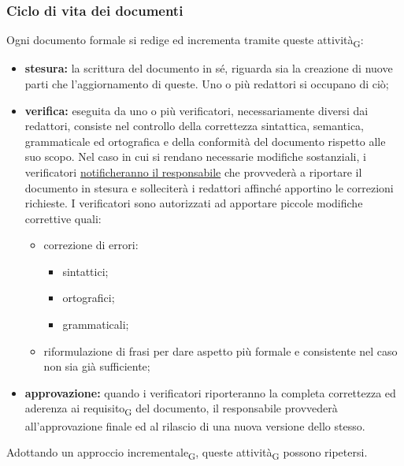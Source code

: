     \subsubsection{Ciclo di vita dei documenti}
    \label{ciclovitadoc}
    Ogni documento formale si redige ed incrementa tramite queste attività\textsubscript{G}:
    \begin{itemize}
        \item \textbf{stesura: }la scrittura del documento in sé, riguarda sia la creazione di nuove parti che l'aggiornamento di queste. Uno o più redattori si occupano di ciò;
        \item \textbf{verifica: }eseguita da uno o più verificatori, necessariamente diversi dai redattori, consiste nel controllo della correttezza sintattica, semantica, grammaticale ed ortografica e della conformità del documento rispetto alle suo scopo. Nel caso in cui si rendano necessarie modifiche sostanziali, i verificatori \hyperref[risoluzioneproblemi]{notificheranno il responsabile} che provvederà a riportare il documento in stesura e solleciterà i redattori affinché apportino le correzioni richieste. I verificatori sono autorizzati ad apportare piccole modifiche correttive quali:
        \begin{itemize}
            \item correzione di errori:
                \begin{itemize}
                    \item sintattici;
                    \item ortografici;
                    \item grammaticali;
                \end{itemize}

            \item riformulazione di frasi per dare aspetto più formale e consistente nel caso non sia già sufficiente;
        \end{itemize}
        \item \textbf{approvazione: }quando i verificatori riporteranno la completa correttezza ed aderenza ai requisito\textsubscript{G} del documento, il responsabile provvederà all'approvazione finale ed al rilascio di una nuova versione dello stesso.
    \end{itemize}
    Adottando un approccio incrementale\textsubscript{G}, queste attività\textsubscript{G} possono ripetersi.
